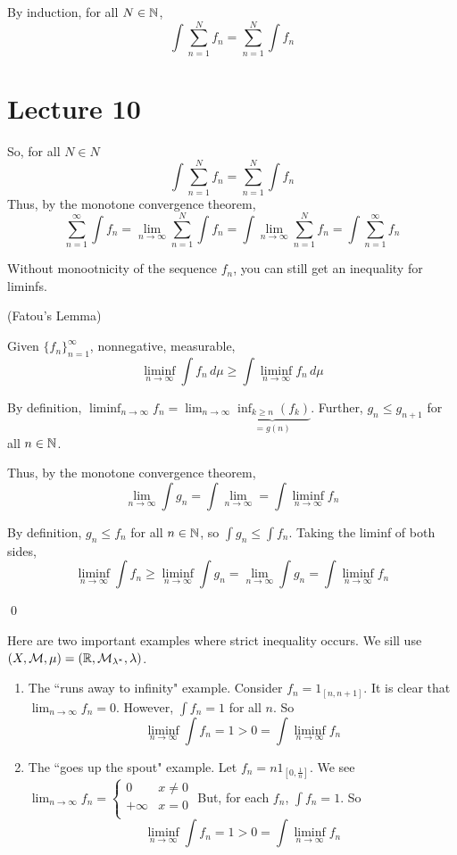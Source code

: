 \documentclass[x11names,reqno,14pt]{extarticle}
\newcommand*{\oo}{\infty}
\newcommand{\seq}[1]{_{#1 = 1}^\oo}
\begin{document}
By induction, for all $N \in \mathbb{N}$,
\[
\int\sum_{n=1}^Nf_n = \sum_{n=1}^N\int f_n
\]

\section*{Lecture 10}

So, for all $N \in N$ 
\[
\int\sum_{n=1}^Nf_n = \sum_{n=1}^N\int f_n
\]
Thus, by the monotone convergence theorem, 
\[
\sum\seq{n}\int f_n = \lim_{n\to\oo}\sum_{n=1}^N\int f_n = \int\lim_{n\to\oo}\sum_{n=1}^N f_n = \int \sum\seq{n} f_n
\]

Without monootnicity of the sequence $f_n$, you can still get an inequality for liminfs. 

\lem (Fatou's Lemma)

Given $\{f_n\}\seq{n}$, nonnegative, measurable, 
\[
\liminf_{n\to\oo}\int f_n\,d\mu \geq \int \liminf_{n\to\oo}f_n\,d\mu
\]

\proof

By definition, $\liminf_{n\to\oo}f_n = \lim_{n\to\oo}\underbrace{\inf_{k\geq n}(f_k)}_{= g(n)}$. Further, $g_n \leq g_{n + 1}$ for all $n \in \mathbb{N}$. 

Thus, by the monotone convergence theorem, 
\[
\lim_{n\to\oo}\int g_n = \int\lim_{n\to\oo} = \int \liminf_{n\to\oo}f_n
\]

By definition, $g_n \leq f_n$ for all $n \in \mathbb{N}$, so $\int g_n \leq \int f_n$. Taking the liminf of both sides, 
\[
\liminf_{n\to\oo}\int f_n \geq \liminf_{n\to\oo}\int g_n = \lim_{n\to\oo}\int g_n = \int \liminf_{n\to\oo}f_n
\]

\qed

\exm 

Here are two important examples where strict inequality occurs. We sill use $(X, \mathcal{M}, \mu) = (\mathbb{R}, \mathcal{M}_{\lambda^*}, \lambda)$.

\begin{enumerate}
\item The ``runs away to infinity" example. Consider $f_n = 1_{[n, n + 1]}$. It is clear that $\lim_{n\to\oo}f_n = 0$. However, $\int f_n = 1$ for all $n$. So
\[
\liminf_{n\to\oo}\int f_n = 1 > 0 = \int \liminf_{n\to\oo}f_n
\]
\item The ``goes up the spout" example. Let $f_n = n1_{[0, \frac{1}{n}]}$. We see $\lim_{n\to\oo}f_n = \begin{cases} 0 & x \neq 0 \\ +\oo & x = 0 \\ \end{cases}$ But, for each $f_n$, $\int f_n = 1$. So
\[
\liminf_{n\to\oo}\int f_n = 1 > 0 = \int \liminf_{n\to\oo}f_n
\]
\end{enumerate}
\end{document}
